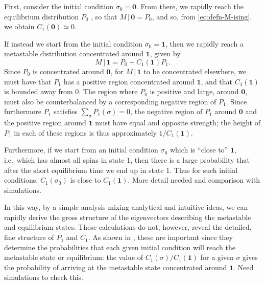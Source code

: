 \documentclass[10pt]{article}
\newcommand{\zeros}{\mathbf{0}}
\newcommand{\ones}{\mathbf{1}}
\newcommand{\given}{\, | \,}
\newcommand{\comment}[1]{{\color{red}#1}}
\begin{document}
First, consider the initial condition $\sigma_0 = \zeros$. From there,
we rapidly reach the equilibrium distribution $P_0$ , so that $M \given \zeros = P_0$, and so, from \eqref{eq:defn-M-ising}, we
obtain $C_1(\zeros) \simeq 0$.

If instead we start from the initial condition $\sigma_0 = \ones$, then we
rapidly reach a metastable distribution concentrated around $\ones$, given by
\begin{equation}
 M \given \ones = P_0 + C_1(\ones) P_1.
\end{equation}
Since $P_0$ is concentrated around $\zeros$, for $M \given \ones$ to be concentrated elsewhere, we must have that
$P_1$ has a positive region concentrated around $\ones$, and that $C_1(\ones)$ is bounded away from $0$.
The region where $P_0$ is positive and large, around $\zeros$, must also be counterbalanced by a corresponding  negative region of $P_1$.
Since furthermore $P_1$ satisfies
$\sum_\sigma P_1(\sigma) = 0$, the negative region of $P_1$ around $\zeros$ and the positive region around $\ones$ must have equal and opposite strength; the height of $P_1$ in each of these regions is thus 
approximately $1 / C_1(\ones)$.



Furthermore, if we start from an initial condition $\sigma_0$ which is
``close to'' $\ones$, i.e.\ which has almost all spins in state $1$, then there
is a large probability that after the short equilibrium time we end up in state
$1$. Thus for such initial conditions, $C_1(\sigma_0)$ is close to
$C_1(\ones)$.  \comment{More detail needed and comparison with simulations.}


In this way, by a simple analysis mixing analytical and intuitive ideas, we can
rapidly derive the gross structure of the eigenvectors describing the
metastable and equilibrium states.
These calculations do not, however, reveal the detailed, fine structure of
$P_1$ and $C_1$. As shown in \cite{LarraldeLeyvrazSandersJStatMech2006}, these
are important since they determine the probabilities that each given initial
condition will reach the metastable state or equilibrium:
the
value of $C_1(\sigma) / C_1(\ones)$ for a given $\sigma$ gives the probability
of arriving at the metastable state concentrated around $\ones$. \comment{Need
simulations to check this.}
\end{document}
